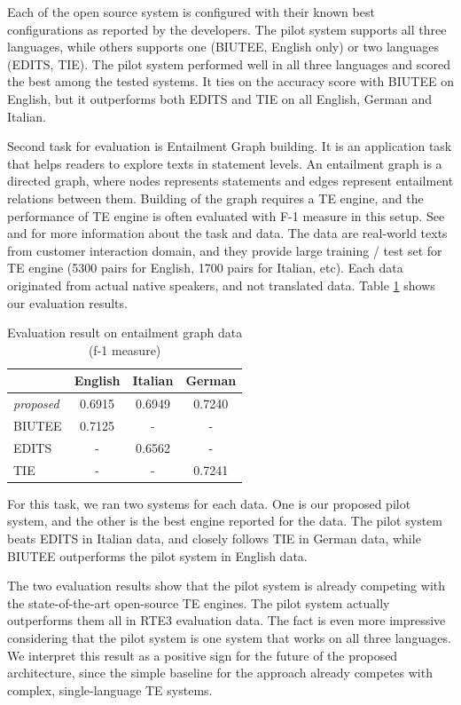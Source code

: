 \documentclass[11pt,letterpaper]{article}
\begin{document}
Each of the open source system is configured with their known best
configurations as reported by the developers. The pilot system
supports all three languages, while others supports one (BIUTEE,
English only) or two languages (EDITS, TIE). The pilot system
performed well in all three languages and scored the best among the
tested systems. It ties on the accuracy score with BIUTEE on English,
but it outperforms both EDITS and TIE on all English, German and
Italian. 

Second task for evaluation is Entailment Graph building. It is an
application task that helps readers to explore texts in statement
levels. An entailment graph is a directed graph, where nodes
represents statements and edges represent entailment relations
between them. Building of the graph requires a TE engine, and the
performance of TE engine is often evaluated with F-1 measure in this
setup. See \cite{} and \cite{} for more information about the task and
data.
The data are real-world texts from customer interaction domain, and
they provide large training / test set for TE engine (5300 pairs for
English, 1700 pairs for Italian, etc). Each data originated from
actual native speakers, and not translated data. Table
\ref{table:egraph} shows our evaluation results.       

\begin{table}[t!]
\centering
\small
\begin{tabular}{l|ccc}
              &   English    &   Italian   &  German  \\
\hline
{\em proposed}&   0.6915     &   0.6949    &   0.7240  \\
BIUTEE        &   0.7125     &     -       &     -     \\
EDITS         &      -       &   0.6562    &     -     \\
TIE           &      -       &     -       &   0.7241  \\ 
\end{tabular}
\caption{Evaluation result on entailment graph data (f-1 measure)}
\label{table:egraph}
\end{table}

For this task, we ran two systems for each data. One is our proposed
pilot system, and the other is the best engine reported for the
data. The pilot system beats EDITS in Italian data, and closely
follows TIE in German data, while BIUTEE outperforms the pilot system
in English data.  

The two evaluation results show that the pilot system is already
competing with the state-of-the-art open-source TE engines. The pilot 
system actually outperforms them all in RTE3 evaluation data. The fact
is even more impressive considering that the pilot system is one
system that works on all three languages.
We interpret this result as a positive sign for the future of the
proposed architecture, since the simple baseline for the approach
already competes with complex, single-language TE systems. 
\end{document}
